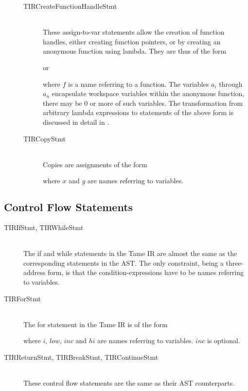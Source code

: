 \begin{description}
\begin{description}
\vspace{.2cm}
\item[TIRCreateFunctionHandleStmt] \hfill \\
These assign-to-var statements allow the creation of function handles,
either creating function pointers, or by creating an anonymous 
function using lambda. They are thus of the form

 or            

where $f$ is a name referring to a function. The variables $a_i$ through
$a_n$ encapsulate workspace variables within the anonymous function,
there may be 0 or more of such variables. The transformation
from arbitrary lambda expressions to statements of the above form
is discussed in detail in .

\item[TIRCopyStmt] \hfill \\
Copies are assignments of the form

where $x$ and $y$ are names referring to variables.
\end{description}
\end{description}

\subsection{Control Flow Statements}
\begin{description}
\item[TIRIfStmt, TIRWhileStmt] \hfill \\
The if and while statements in the Tame IR are almost the same
as the corresponding statements in the AST. The only constraint,
being a three-address form, is that the condition-expressions
have to be names referring to variables.

\item[TIRForStmt] \hfill \\
The for statement in the Tame IR is of the form

where $i$, $low$, $inc$ and $hi$ are names referring to variables. $inc$
is optional.

\item[TIRReturnStmt, TIRBreakStmt, TIRContinueStmt] \hfill \\
These control flow statements are the same as their AST counterparts.
\end{description}

